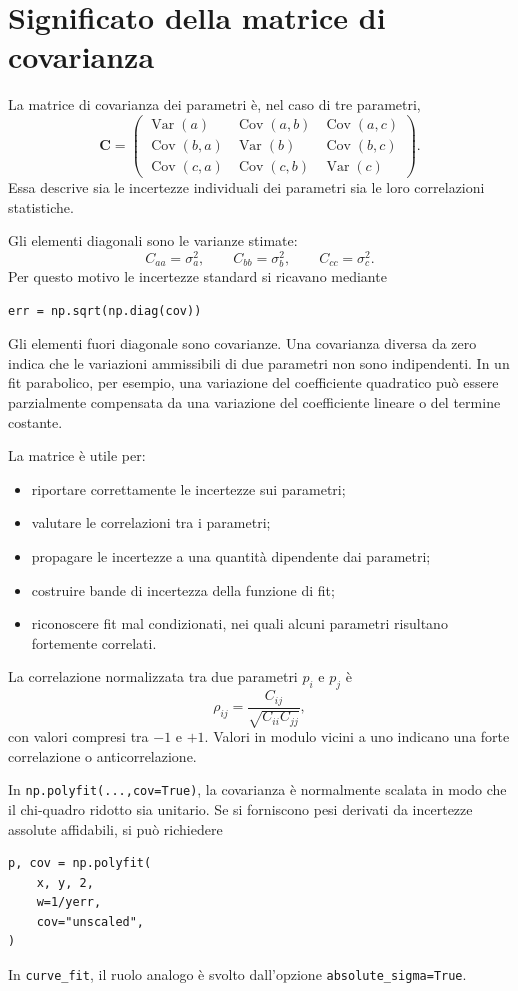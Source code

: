 \documentclass[11pt,a4paper]{book}
\begin{document}
\section{Significato della matrice di covarianza}
La matrice di covarianza dei parametri è, nel caso di tre parametri,
\[
 \mathbf{C}=
 \begin{pmatrix}
 \operatorname{Var}(a) & \operatorname{Cov}(a,b) & \operatorname{Cov}(a,c)\\
 \operatorname{Cov}(b,a) & \operatorname{Var}(b) & \operatorname{Cov}(b,c)\\
 \operatorname{Cov}(c,a) & \operatorname{Cov}(c,b) & \operatorname{Var}(c)
 \end{pmatrix}.
\]
Essa descrive sia le incertezze individuali dei parametri sia le loro correlazioni statistiche.

Gli elementi diagonali sono le varianze stimate:
\[
 C_{aa}=\sigma_a^2,\qquad
 C_{bb}=\sigma_b^2,\qquad
 C_{cc}=\sigma_c^2.
\]
Per questo motivo le incertezze standard si ricavano mediante
\begin{lstlisting}
err = np.sqrt(np.diag(cov))
\end{lstlisting}
Gli elementi fuori diagonale sono covarianze. Una covarianza diversa da zero indica che le variazioni ammissibili di due parametri non sono indipendenti. In un fit parabolico, per esempio, una variazione del coefficiente quadratico può essere parzialmente compensata da una variazione del coefficiente lineare o del termine costante.

La matrice è utile per:
\begin{itemize}
  \item riportare correttamente le incertezze sui parametri;
  \item valutare le correlazioni tra i parametri;
  \item propagare le incertezze a una quantità dipendente dai parametri;
  \item costruire bande di incertezza della funzione di fit;
  \item riconoscere fit mal condizionati, nei quali alcuni parametri risultano fortemente correlati.
\end{itemize}

La correlazione normalizzata tra due parametri $p_i$ e $p_j$ è
\[
 \rho_{ij}=\frac{C_{ij}}{\sqrt{C_{ii}C_{jj}}},
\]
con valori compresi tra $-1$ e $+1$. Valori in modulo vicini a uno indicano una forte correlazione o anticorrelazione.

In \texttt{np.polyfit(...,cov=True)}, la covarianza è normalmente scalata in modo che il chi-quadro ridotto sia unitario. Se si forniscono pesi derivati da incertezze assolute affidabili, si può richiedere
\begin{lstlisting}
p, cov = np.polyfit(
    x, y, 2,
    w=1/yerr,
    cov="unscaled",
)
\end{lstlisting}
In \texttt{curve\_fit}, il ruolo analogo è svolto dall'opzione \texttt{absolute\_sigma=True}.
\end{document}
